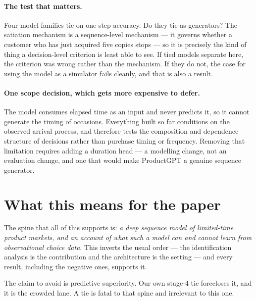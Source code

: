 \documentclass[11pt]{article}
\begin{document}
\paragraph{The test that matters.} Four model families tie on one-step accuracy.
Do they tie as generators? The satiation mechanism is a sequence-level
mechanism --- it governs whether a customer who has just acquired five copies
stops --- so it is precisely the kind of thing a decision-level criterion is
least able to see. If tied models separate here, the criterion was wrong rather
than the mechanism. If they do not, the case for using the model as a simulator
fails cleanly, and that is also a result.

\paragraph{One scope decision, which gets more expensive to defer.} The model
consumes elapsed time as an input and never predicts it, so it cannot generate
the timing of occasions. Everything built so far conditions on the observed
arrival process, and therefore tests the composition and dependence structure
of decisions rather than purchase timing or frequency. Removing that limitation
requires adding a duration head --- a modelling change, not an evaluation
change, and one that would make ProductGPT a genuine sequence generator.

\section{What this means for the paper}

The spine that all of this supports is: \emph{a deep sequence model of
limited-time product markets, and an account of what such a model can and
cannot learn from observational choice data}. This inverts the usual order ---
the identification analysis is the contribution and the architecture is the
setting --- and every result, including the negative ones, supports it.

The claim to avoid is predictive superiority. Our own stage-4 tie forecloses
it, and it is the crowded lane. A tie is fatal to that spine and irrelevant to
this one.
\end{document}

